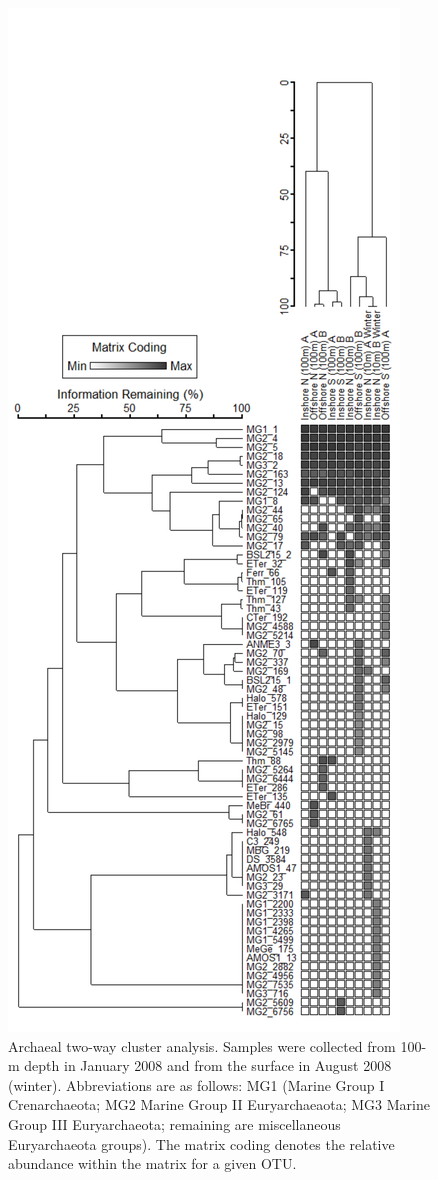 \begin{figure}
	[htbp] \centering 
	\includegraphics[width=0.5
	\textwidth]{Chapter_2_MIRADA/Figures/Figure_4_PAL_Av6_2way_notrans_Relmax_SOR_aveneigh} 
	\caption[Archaeal two-way cluster analysis.]{Archaeal two-way cluster analysis. Samples were collected from 100-m depth in January 2008 and from the surface in August 2008 (winter). Abbreviations are as follows: MG1 (Marine Group I Crenarchaeota; MG2 Marine Group II Euryarchaeaota; MG3 Marine Group III Euryarchaeota; remaining are miscellaneous Euryarchaeota groups). The matrix coding denotes the relative abundance within the matrix for a given OTU.} 
	\label{fig:cca1.1} 
\end{figure}

